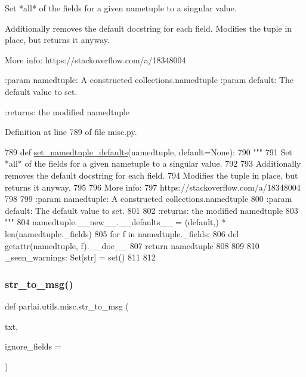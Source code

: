 \begin{DoxyVerb}Set *all* of the fields for a given nametuple to a singular value.

Additionally removes the default docstring for each field.
Modifies the tuple in place, but returns it anyway.

More info:
https://stackoverflow.com/a/18348004

:param namedtuple: A constructed collections.namedtuple
:param default: The default value to set.

:returns: the modified namedtuple
\end{DoxyVerb}
 

Definition at line 789 of file misc.\+py.


\begin{DoxyCode}
789 \textcolor{keyword}{def }\hyperlink{namespaceparlai_1_1utils_1_1misc_a8781cc03272b3a118fcd9e5a9f4ca1dd}{set\_namedtuple\_defaults}(namedtuple, default=None):
790     \textcolor{stringliteral}{"""}
791 \textcolor{stringliteral}{    Set *all* of the fields for a given nametuple to a singular value.}
792 \textcolor{stringliteral}{}
793 \textcolor{stringliteral}{    Additionally removes the default docstring for each field.}
794 \textcolor{stringliteral}{    Modifies the tuple in place, but returns it anyway.}
795 \textcolor{stringliteral}{}
796 \textcolor{stringliteral}{    More info:}
797 \textcolor{stringliteral}{    https://stackoverflow.com/a/18348004}
798 \textcolor{stringliteral}{}
799 \textcolor{stringliteral}{    :param namedtuple: A constructed collections.namedtuple}
800 \textcolor{stringliteral}{    :param default: The default value to set.}
801 \textcolor{stringliteral}{}
802 \textcolor{stringliteral}{    :returns: the modified namedtuple}
803 \textcolor{stringliteral}{    """}
804     namedtuple.\_\_new\_\_.\_\_defaults\_\_ = (default,) * len(namedtuple.\_fields)
805     \textcolor{keywordflow}{for} f \textcolor{keywordflow}{in} namedtuple.\_fields:
806         del getattr(namedtuple, f).\_\_doc\_\_
807     \textcolor{keywordflow}{return} namedtuple
808 
809 
810 \_seen\_warnings: Set[str] = set()
811 
812 
\end{DoxyCode}
\mbox{\label{namespaceparlai_1_1utils_1_1misc_a1b053cd9c56e6fa79b058fff587b3a48}} 
\subsubsection{\texorpdfstring{str\+\_\+to\+\_\+msg()}{str\_to\_msg()}}
{\footnotesize\ttfamily def parlai.\+utils.\+misc.\+str\+\_\+to\+\_\+msg (\begin{DoxyParamCaption}\item[{}]{txt,  }\item[{}]{ignore\+\_\+fields = {\ttfamily \textquotesingle{}\textquotesingle{}} }\end{DoxyParamCaption})}

